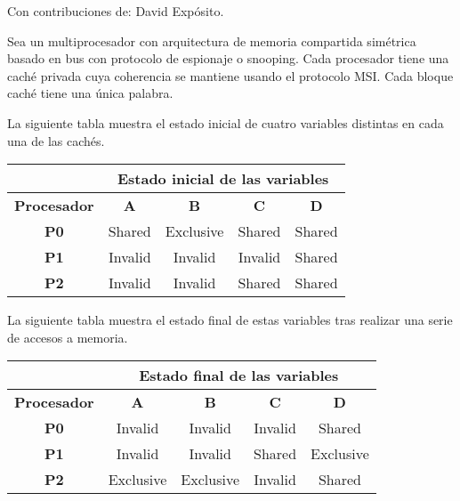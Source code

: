 \begin{acexercise}
Con contribuciones de: David Expósito.
\end{acexercise}

Sea un multiprocesador con arquitectura de memoria compartida simétrica basado
en bus con protocolo de espionaje o snooping. Cada procesador tiene una caché
privada cuya coherencia se mantiene usando el protocolo MSI. Cada bloque caché
tiene una única palabra.  

La siguiente tabla muestra el estado inicial de cuatro variables distintas en
cada una de las cachés. 

\medskip

\begin{tabular}{|c|c|c|c|c|}
\hline
&
\multicolumn{4}{|c|}{Estado inicial de las variables}
\\
\hline

\textbf{Procesador} &
\textbf{A} &
\textbf{B} &
\textbf{C} &
\textbf{D}
\\
\hline
\hline

\textbf{P0} & 
Shared & Exclusive & Shared & Shared
\\
\hline

\textbf{P1} &
Invalid & Invalid & Invalid & Shared
\\
\hline

\textbf{P2} &
Invalid & Invalid & Shared & Shared
\\
\hline

\end{tabular}

\medskip

La siguiente tabla muestra el estado final de estas variables tras realizar una
serie de accesos a memoria. 

\medskip

\begin{tabular}{|c|c|c|c|c|}
\hline
&
\multicolumn{4}{|c|}{Estado final de las variables}
\\
\hline

\textbf{Procesador} &
\textbf{A} &
\textbf{B} &
\textbf{C} &
\textbf{D}
\\
\hline
\hline

\textbf{P0} & 
Invalid & Invalid & Invalid & Shared
\\
\hline

\textbf{P1} &
Invalid & Invalid & Shared & Exclusive
\\
\hline

\textbf{P2} &
Exclusive & Exclusive & Invalid & Shared
\\
\hline

\end{tabular}

